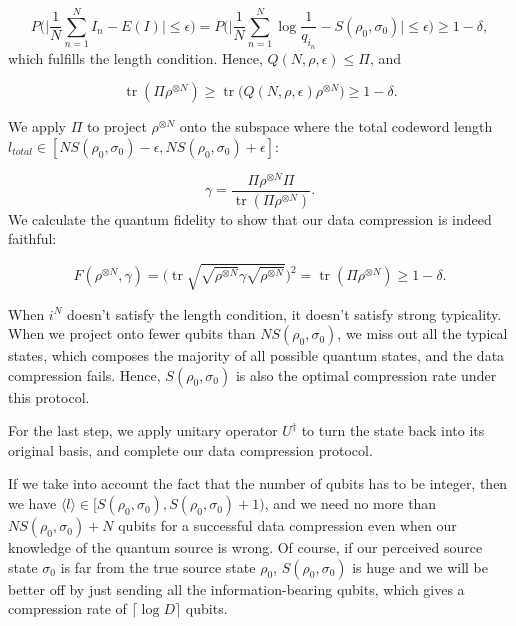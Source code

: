 \documentclass[11pt]{article}
\DeclareMathOperator{\tr}{\text{tr}}
\begin{document}
\begin{equation}
    P\bigg(\Big|\frac{1}{N}\sum_{n=1}^{N} I_n - E(I) \Big| \leq \epsilon\bigg) = 
    P\bigg(\Big|\frac{1}{N}\sum_{n=1}^{N} \log \frac{1}{q_{i_n}} - S(\rho_0, \sigma_0)  \Big| \leq \epsilon\bigg) 
    \geq 1 - \delta,
\end{equation}
which fulfills the length condition. Hence, $Q(N, \rho, \epsilon) \leq \Pi$, and 

\begin{equation}
    \tr(\Pi \rho^{\otimes N}) \geq \tr \big( Q(N, \rho, \epsilon) \rho^{\otimes N} \big)
    \geq 1 - \delta.
\end{equation}

We apply $\Pi$ to project $\rho^{\otimes N}$ onto the subspace where the total codeword length $l_{total} \in [N S(\rho_0, \sigma_0) - \epsilon, N S(\rho_0, \sigma_0) + \epsilon]$:

\begin{equation}
\gamma= \frac{   \Pi \rho^{\otimes N} \Pi}{\tr(\Pi \rho^{\otimes N})}.  
\end{equation}
We calculate the quantum fidelity to show that our data compression is indeed faithful:

\begin{equation}
   F(\rho^{\otimes N}, \gamma)
   =\Bigg( \tr \sqrt{\sqrt{\rho^{\otimes N}}
    \gamma \sqrt{\rho^{\otimes N}}} \Bigg)^2
   = \tr(\Pi \rho^{\otimes N})  
    \geq 1 - \delta.
\end{equation}

When $i^N$ doesn't satisfy the length condition, it doesn't satisfy strong typicality. When we project onto fewer qubits than $N S(\rho_0, \sigma_0)$, we miss out all the typical states, which composes the majority of all possible quantum states, and the data compression fails. Hence, $S(\rho_0, \sigma_0)$ is also the optimal compression rate under this protocol.

For the last step, we apply unitary operator $U^{\dagger}$ to turn the state back into its original basis, and complete our data compression protocol.

If we take into account the fact that the number of qubits has to be integer, then we have $\langle l \rangle \in [S(\rho_0, \sigma_0), S(\rho_0, \sigma_0) + 1)$, and we need no more than $N S(\rho_0, \sigma_0) + N$ qubits for a successful data compression even when our knowledge of the quantum source is wrong. Of course, if our perceived source state $\sigma_0$ is far from the true source state $\rho_0$, $S(\rho_0, \sigma_0)$ is huge and we will be better off by just sending all the information-bearing qubits, which gives a compression rate of $\lceil \log D \rceil$ qubits. 
\end{document}

